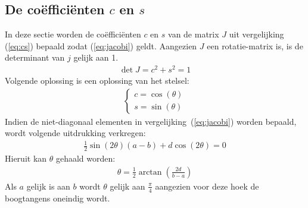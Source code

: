 \documentclass[a4paper, 12pt, titlepage, fleqn]{article}
\begin{document}
\subsection{De co\"effici\"enten $c$ en $s$}
In deze sectie worden de co\"effici\"enten $c$ en $s$ van de matrix $J$ uit vergelijking (\ref{eq:cs}) bepaald zodat (\ref{eq:jacobi}) geldt. Aangezien $J$ een rotatie-matrix is, is de determinant van $j$ gelijk aan 1.
\begin{align*}
\det J = c^2 + s^2 = 1
\end{align*}
Volgende oplossing is een oplossing van het stelsel:
\begin{align*}
\begin{cases}
c = \cos(\theta)\\
s = \sin(\theta)
\end{cases}
\end{align*}
Indien de niet-diagonaal elementen in vergelijking~(\ref{eq:jacobi}) worden bepaald, wordt volgende uitdrukking verkregen:
\begin{align*}
\frac{1}{2}\sin(2\theta)(a-b) + d\cos(2\theta) = 0
\end{align*}
Hieruit kan $\theta$ gehaald worden:
\begin{align*}
\theta = \frac{1}{2}\arctan\left(\frac{2d}{b-a}\right)
\end{align*}
Als $a$ gelijk is aan $b$ wordt $\theta$ gelijk aan $\frac{\pi}{4}$ aangezien voor deze hoek de boogtangens oneindig wordt.
\end{document}
